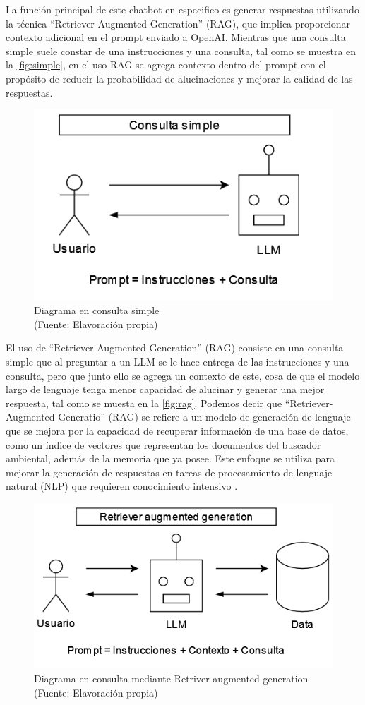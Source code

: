 \newpage


La función principal de este chatbot en especifico es generar respuestas utilizando la técnica ``Retriever-Augmented Generation'' (RAG), 
que implica proporcionar contexto adicional en el prompt enviado a OpenAI. Mientras que una consulta simple suele 
constar de una instrucciones y una consulta, tal como se muestra en la \autoref{fig:simple}, en el uso RAG se agrega contexto dentro del prompt con el propósito de reducir la 
probabilidad de alucinaciones y mejorar la calidad de las respuestas. 

\begin{figure}[ht!]
    \centering
    \includegraphics[width=.4\textwidth]{figures/huemul6.png}
    \caption[Diagrama en consulta simple]{Diagrama en consulta simple\\
    {\scriptsize (Fuente: Elavoración propia)}}
    \label{fig:simple}
\end{figure}


El uso de ``Retriever-Augmented Generation'' (RAG)
consiste en una consulta simple que al preguntar a un LLM se le hace entrega de las instrucciones y una consulta, pero que junto ello se agrega un contexto 
de este, cosa de que el modelo largo de lenguaje tenga menor capacidad de alucinar y generar una mejor respuesta, tal como se muesta en la \autoref{fig:rag}. Podemos decir
que ``Retriever-Augmented Generatio'' (RAG) se refiere a un modelo de generación de lenguaje que se mejora por la capacidad 
de recuperar información de una base de datos, como un índice de vectores que representan los documentos del buscador ambiental, 
además de la memoria que ya posee. Este enfoque se utiliza para mejorar la generación de respuestas en tareas de procesamiento 
de lenguaje natural (NLP) que requieren conocimiento intensivo \cite{raq}.

\begin{figure}[ht!]
    \centering
    \includegraphics[width=.4\textwidth]{figures/huemul5.png}
    \caption[Diagrama en consulta mediante Retriver augmented generation]{Diagrama en consulta mediante Retriver augmented generation\\
    {\scriptsize (Fuente: Elavoración propia)}}
    \label{fig:rag}
\end{figure}

